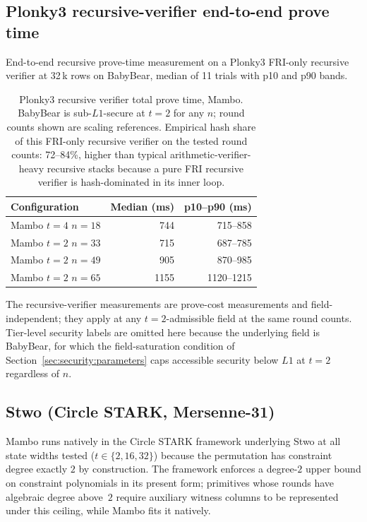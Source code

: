 \documentclass[11pt,a4paper]{article}
\theoremstyle{definition}
\begin{document}
\subsection{Plonky3 recursive-verifier end-to-end prove time}

End-to-end recursive prove-time measurement on a Plonky3 FRI-only
recursive verifier at 32\,k rows on BabyBear, median of 11 trials with
p10 and p90 bands.

\begin{table}[H]
\centering
\caption{Plonky3 recursive verifier total prove time, Mambo. BabyBear
is sub-$L1$-secure at $t=2$ for any $n$; round counts shown are scaling
references. Empirical hash share of this FRI-only recursive verifier
on the tested round counts: 72--84\%, higher than typical
arithmetic-verifier-heavy recursive stacks because a pure FRI
recursive verifier is hash-dominated in its inner loop.}
\label{tab:perf-plonky3-recursive}
\small
\begin{tabular}{@{}lrr@{}}
\toprule
Configuration & Median (ms) & p10--p90 (ms) \\
\midrule
Mambo $t=4$ $n=18$  &  744 & 715--858 \\
Mambo $t=2$ $n=33$  &  715 & 687--785 \\
Mambo $t=2$ $n=49$  &  905 & 870--985 \\
Mambo $t=2$ $n=65$  & 1155 & 1120--1215 \\
\bottomrule
\end{tabular}
\end{table}

The recursive-verifier measurements are prove-cost measurements and
field-independent; they apply at any $t=2$-admissible field at the
same round counts. Tier-level security labels are omitted here
because the underlying field is BabyBear, for which the
field-saturation condition of
Section~\ref{sec:security:parameters} caps accessible security below
$L1$ at $t=2$ regardless of $n$.

\subsection{Stwo (Circle STARK, Mersenne-31)}

Mambo runs natively in the Circle STARK framework underlying Stwo at
all state widths tested ($t \in \{2, 16, 32\}$) because the
permutation has constraint degree exactly $2$ by construction. The
framework enforces a degree-$2$ upper bound on constraint polynomials
in its present form; primitives whose rounds have algebraic degree
above~$2$ require auxiliary witness columns to be represented under
this ceiling, while Mambo fits it natively.
\end{document}

